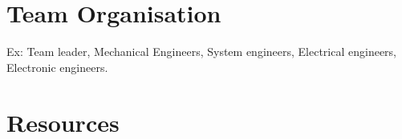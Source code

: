 \documentclass[a4paper]{article}
\begin{document}
\section{Team Organisation}
Ex: Team leader, Mechanical Engineers, System engineers, Electrical engineers, Electronic engineers.
\section {Resources}
\end{document}
